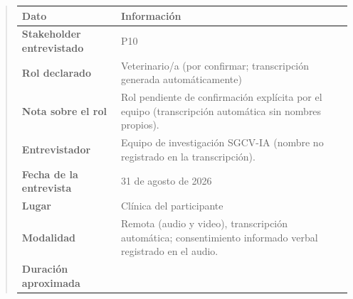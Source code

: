 \documentclass[
]{article}
\newcounter{none} %
\begin{document}
\begin{quote}
{\def\LTcaptype{none} %
\begin{longtable}[]{|
  >{\raggedright\arraybackslash}p{}|
  >{\raggedright\arraybackslash}p{}|}
\hline
\begin{minipage}[b]{\linewidth}\centering
\textbf{Dato}
\end{minipage} & \begin{minipage}[b]{\linewidth}\centering
\textbf{Información}
\end{minipage} \\
\hline
\endhead
\hline
\endlastfoot
\textbf{Stakeholder entrevistado} & \begin{minipage}[t]{\linewidth}\raggedright
P10
\end{minipage} \\
\hline
\textbf{Rol declarado} & \begin{minipage}[t]{\linewidth}\raggedright
Veterinario/a (por confirmar; transcripción generada automáticamente)
\end{minipage} \\
\hline
\textbf{Nota sobre el rol} & \begin{minipage}[t]{\linewidth}\raggedright
Rol pendiente de confirmación explícita por el equipo (transcripción automática sin nombres propios).
\end{minipage} \\
\hline
\textbf{Entrevistador} & \begin{minipage}[t]{\linewidth}\raggedright
Equipo de investigación SGCV-IA (nombre no registrado en la transcripción).
\end{minipage} \\
\hline
\textbf{Fecha de la entrevista} & \begin{minipage}[t]{\linewidth}\raggedright
31 de agosto de 2026
\end{minipage} \\
\hline
\textbf{Lugar} & \begin{minipage}[t]{\linewidth}\raggedright
Clínica del participante
\end{minipage} \\
\hline
\textbf{Modalidad} & \begin{minipage}[t]{\linewidth}\raggedright
Remota (audio y video), transcripción automática; consentimiento informado verbal registrado en el audio.
\end{minipage} \\
\hline
\textbf{Duración aproximada} & \begin{minipage}[t]{\linewidth}\raggedright

\end{minipage}
\end{longtable}}
\end{quote}
\end{document}
